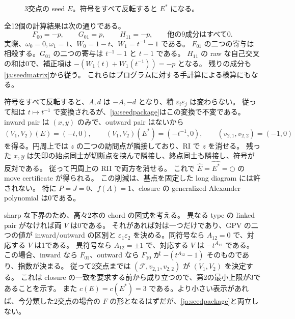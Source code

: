 \documentclass[12pt]{amsart}
\theoremstyle{definition}
\theoremstyle{remark}
\numberwithin{equation}{section}
\newcommand{\Package}{\mathcal F}
\newcommand{\clK}[1]{\widehat{#1}}
\newcommand{\eps}{\varepsilon}
\begin{document}
\begin{figure}[ht]
\centering
{}
\caption{3交点の seed $E$。符号をすべて反転すると $E^*$ になる。}
\end{figure}

全12個の計算結果は次の通りである。
\begin{equation}\label{ja:seedpackage}
F_{00}=-p,\qquad G_{01}=p,\qquad H_{11}=-p,\qquad
\text{他の9成分はすべて0}.
\end{equation}
実際、$\omega_0=0,\omega_1=1$、$W_0=1-t$、$W_1=t^{-1}-1$ である。
$F_{01}$ の二つの寄与は相殺する。$G_{01}$ の二つの寄与は
$t^{-1}-1$ と $t-1$ である。
$H_{11}$ の raw な自己交叉の和は0で、補正項は
$-(W_1(t)+W_1(t^{-1}))=-p$ となる。
残りの成分も\eqref{ja:seedmatrix}から従う。
これらはプログラムに対する手計算による検算にもなる。

符号をすべて反転すると、$A,d$ は $-A,-d$ となり、積 $\eps_i\eps_j$ は変わらない。
従って組は $t\mapsto t^{-1}$ で変換されるが、\eqref{ja:seedpackage}はこの変換で不変である。
inward pair は $(x,y)$ のみで、outward pair はないから
\[
(V_1,V_2)(E)=(-t,0),\qquad(V_1,V_2)(E^*)=(-t^{-1},0),
\qquad(v_{2,1},v_{2,2})=(-1,0)
\]
を得る。円周上では $z$ の二つの訪問点が隣接しており、RI で $z$ を消せる。
残った $x,y$ は矢印の始点同士が切断点を挟んで隣接し、終点同士も隣接し、符号が反対である。
従って円周上の RII で両方を消せる。
これで $\clK E=\clK{E^*}=\bigcirc$ の move certificate が得られる。
この削減は、基点を固定した long diagram には許されない。
特に $P=J=0$、$f(A)=1$、closure の generalized Alexander polynomial は0である。

sharp な下界のため、高々2本の chord の図式を考える。
異なる type の linked pair がなければ両 $V$ は0である。
それがあれば対は一つだけであり、GPV の二つの値が inward/outward の区別と
$\eps_1\eps_2$ を決める。同符号なら $A_{12}=0$ で、対応する $V$ は1である。
異符号なら $A_{12}=\pm1$ で、対応する $V$ は $-t^{A_{12}}$ である。
この場合、inward なら $F_{01}$、outward なら $F_{10}$ が
$-(t^{A_{12}}-1)$ そのものであり、指数が決まる。
従って2交点までは $(\Package,v_{2,1},v_{2,2})$ が $(V_1,V_2)$ を決定する。
これは closure の一致を要求する前から成り立つので、第2の最小上限が3であることを示す。
また $c(E)=c(E^*)=3$ である。より小さい表示があれば、今分類した2交点の場合の
$F$ の形となるはずだが、\eqref{ja:seedpackage}と両立しない。
\end{document}
